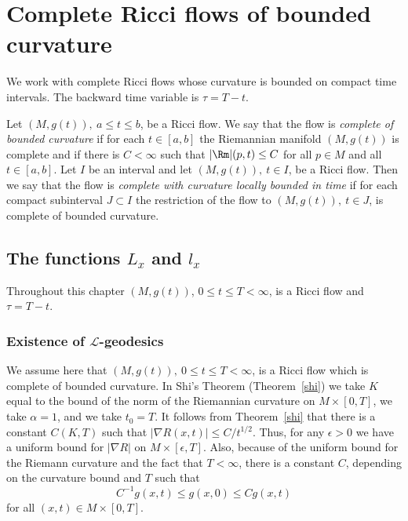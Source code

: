 \chapter{Complete Ricci flows of bounded curvature}
\label{chap:complete-ricci-flows}
\label{newcomp2}

We work with complete Ricci flows whose curvature is bounded on compact
time intervals. The backward time variable is $\tau=T-t$.

\begin{definition}
\label{def:complete-bounded-curvature-flow}
Let $(M,g(t)),\ a\le t\le b$, be a  Ricci flow. We say that the flow
is {\em complete of bounded curvature} if for each $t\in [a,b]$ the
Riemannian manifold $(M,g(t))$ is complete and if there is
$C<\infty$ such that $|\Rm|(p,t)\le C$ for all $p\in M$ and all
$t\in [a,b]$. Let $I$ be an interval and let $(M,g(t)),\ t\in I$, be
a Ricci flow. Then we say that the flow is {\em complete with
curvature locally bounded in time} if for each compact subinterval
$J\subset I$ the restriction of the flow to $(M,g(t)),\ t\in J$, is
complete of bounded curvature.
\end{definition}




\section{The functions $L_{x}$ and $l_{x}$}

Throughout this chapter $(M,g(t))$, $0\le t\le T<\infty$, is a Ricci
flow and $\tau=T-t$.

\subsection{Existence of ${\mathcal L}$-geodesics}


We assume here that $(M,g(t)),\ 0\le t\le T<\infty$, is a Ricci flow
which is complete of bounded curvature. In Shi's Theorem
(Theorem~\ref{shi}) we take $K$ equal to the bound of the norm of
the Riemannian curvature on $M\times [0,T]$, we take $\alpha=1$, and
we take $t_0=T$. It follows from Theorem~\ref{shi} that there is a
constant $C(K,T)$ such that $|\nabla R(x,t)|\le C/t^{1/2}$. Thus,
for any $\epsilon>0$ we have a uniform bound for $|\nabla R|$ on
$M\times [\epsilon,T]$. Also, because of the uniform bound for the
Riemann curvature and the fact that $T<\infty$, there is a constant
$C$, depending on the curvature bound and $T$ such that
\begin{equation}\label{compmetric}
C^{-1}g(x,t)\le g(x,0)\le Cg(x,t)
\end{equation}
for all $(x,t)\in M\times [0,T]$.





